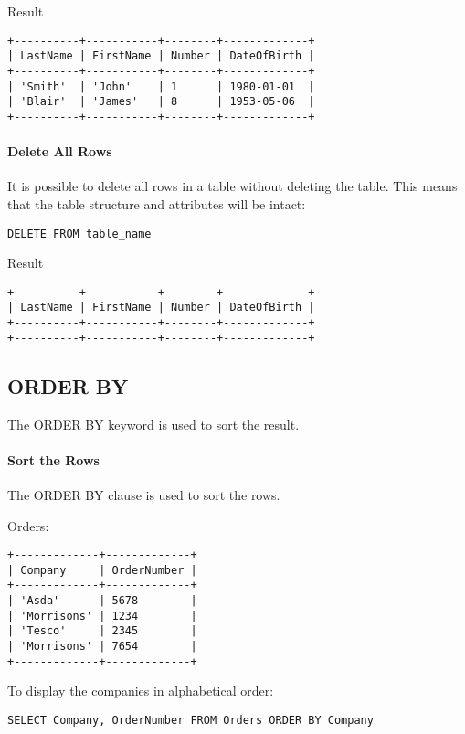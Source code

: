 \documentclass{howto}
\begin{document}
Result
\begin{verbatim}
+----------+-----------+--------+-------------+
| LastName | FirstName | Number | DateOfBirth |
+----------+-----------+--------+-------------+
| 'Smith'  | 'John'    | 1      | 1980-01-01  |
| 'Blair'  | 'James'   | 8      | 1953-05-06  |
+----------+-----------+--------+-------------+
\end{verbatim}


\paragraph{Delete All Rows}

It is possible to delete all rows in a table without deleting the table. This means that the table structure and attributes will be intact:

\begin{verbatim}
DELETE FROM table_name
\end{verbatim}

Result
\begin{verbatim}
+----------+-----------+--------+-------------+
| LastName | FirstName | Number | DateOfBirth |
+----------+-----------+--------+-------------+
+----------+-----------+--------+-------------+
\end{verbatim}

\subsection{ORDER BY}

The ORDER BY keyword is used to sort the result.

\paragraph{Sort the Rows}

The ORDER BY clause is used to sort the rows.

Orders:
\begin{verbatim}
+-------------+-------------+
| Company     | OrderNumber |
+-------------+-------------+
| 'Asda'      | 5678        |
| 'Morrisons' | 1234        |
| 'Tesco'     | 2345        |
| 'Morrisons' | 7654        |
+-------------+-------------+
\end{verbatim}

To display the companies in alphabetical order:
\begin{verbatim}
SELECT Company, OrderNumber FROM Orders ORDER BY Company
\end{verbatim}
\end{document}
